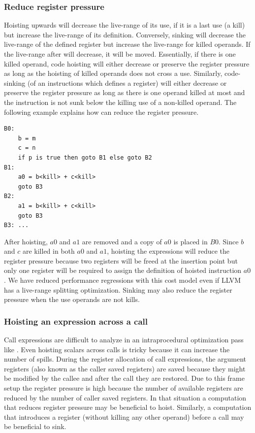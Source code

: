 \documentclass[sigplan,10pt,review,anonymous]{acmart}\settopmatter{printfolios=true,printccs=false,printacmref=false}
\begin{document}
\subsubsection{Reduce register pressure}
\label{hoist:reg-pressure}
Hoisting upwards will decrease the live-range of its use, if it is a last use (a
kill) but increase the live-range of its definition. Conversely, sinking will
decrease the live-range of the defined register but increase the live-range for
killed operands. If the live-range after \GCM{} will decrease, it will be
moved. Essentially, if there is one killed operand, code hoisting will either
decrease or preserve the register pressure as long as the hoisting of killed
operands does not cross a use.  Similarly, code-sinking (of an instructions
which defines a register) will either decrease or preserve the register pressure
as long as there is one operand killed at most and the instruction is not sunk
below the killing use of a non-killed operand. The following example explains
how \GCM{} can reduce the register pressure.

\begin{lstlisting}
B0:
    b = m
    c = n
    if p is true then goto B1 else goto B2
B1:
    a0 = b<kill> + c<kill>
    goto B3
B2:
    a1 = b<kill> + c<kill>
    goto B3
B3: ...
\end{lstlisting}

After hoisting, $a0$ and $a1$ are removed and a copy of $a0$ is placed in
$B0$. Since $b$ and $c$ are killed in both $a0$ and $a1$, hoisting the
expressions will reduce the register pressure because two registers will be
freed at the insertion point but only one register will be required to assign
the definition of hoisted instruction $a0$. We have reduced performance
regressions with this cost model even if LLVM has a live-range splitting
\cite{cooper1998live} optimization. Sinking may also reduce the register
pressure when the use operands are not kills.

\subsubsection{Hoisting an expression across a call}
\label{cost:across-calls}
Call expressions are difficult to analyze in an intraprocedural optimization
pass like \GCM{}. Even hoisting scalars across calls is tricky because it can
increase the number of spills. During the register allocation of call
expressions, the argument registers (also known as the caller saved registers)
are saved because they might be modified by the callee and after the call they
are restored. Due to this frame setup the register pressure is high because the
number of available registers are reduced by the number of caller saved
registers. In that situation a computation that reduces register pressure may be
beneficial to hoist. Similarly, a computation that introduces a register
(without killing any other operand) before a call may be beneficial to sink.
\end{document}

